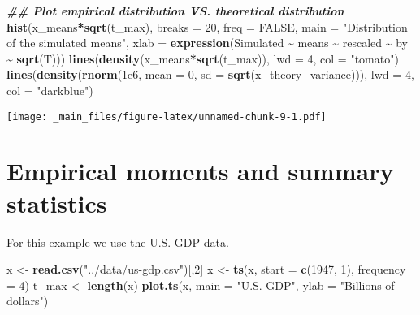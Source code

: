 \documentclass[
]{book}
\newenvironment{Shaded}{\begin{snugshade}}{\end{snugshade}}
\newcommand{\AttributeTok}[1]{\textcolor[rgb]{0.13,0.29,0.53}{#1}}
\newcommand{\ConstantTok}[1]{\textcolor[rgb]{0.56,0.35,0.01}{#1}}
\newcommand{\DecValTok}[1]{\textcolor[rgb]{0.00,0.00,0.81}{#1}}
\newcommand{\DocumentationTok}[1]{\textcolor[rgb]{0.56,0.35,0.01}{\textbf{\textit{#1}}}}
\newcommand{\FloatTok}[1]{\textcolor[rgb]{0.00,0.00,0.81}{#1}}
\newcommand{\FunctionTok}[1]{\textcolor[rgb]{0.13,0.29,0.53}{\textbf{#1}}}
\newcommand{\NormalTok}[1]{#1}
\newcommand{\OtherTok}[1]{\textcolor[rgb]{0.56,0.35,0.01}{#1}}
\newcommand{\SpecialCharTok}[1]{\textcolor[rgb]{0.81,0.36,0.00}{\textbf{#1}}}
\newcommand{\StringTok}[1]{\textcolor[rgb]{0.31,0.60,0.02}{#1}}
\begin{document}
\begin{Shaded}
\begin{Highlighting}[]
\DocumentationTok{\#\# Plot empirical distribution VS. theoretical distribution}
\FunctionTok{hist}\NormalTok{(x\_means}\SpecialCharTok{*}\FunctionTok{sqrt}\NormalTok{(t\_max), }\AttributeTok{breaks =} \DecValTok{20}\NormalTok{, }\AttributeTok{freq =} \ConstantTok{FALSE}\NormalTok{, }
     \AttributeTok{main =} \StringTok{"Distribution of the simulated means"}\NormalTok{, }
     \AttributeTok{xlab =} \FunctionTok{expression}\NormalTok{(Simulated }\SpecialCharTok{\textasciitilde{}}\NormalTok{ means }\SpecialCharTok{\textasciitilde{}}\NormalTok{ rescaled }\SpecialCharTok{\textasciitilde{}}\NormalTok{ by }\SpecialCharTok{\textasciitilde{}} \FunctionTok{sqrt}\NormalTok{(T)))}
\FunctionTok{lines}\NormalTok{(}\FunctionTok{density}\NormalTok{(x\_means}\SpecialCharTok{*}\FunctionTok{sqrt}\NormalTok{(t\_max)), }\AttributeTok{lwd =} \DecValTok{4}\NormalTok{, }\AttributeTok{col =} \StringTok{"tomato"}\NormalTok{)}
\FunctionTok{lines}\NormalTok{(}\FunctionTok{density}\NormalTok{(}\FunctionTok{rnorm}\NormalTok{(}\FloatTok{1e6}\NormalTok{, }\AttributeTok{mean =} \DecValTok{0}\NormalTok{, }\AttributeTok{sd =} \FunctionTok{sqrt}\NormalTok{(x\_theory\_variance))), }\AttributeTok{lwd =} \DecValTok{4}\NormalTok{, }\AttributeTok{col =} \StringTok{"darkblue"}\NormalTok{)}
\end{Highlighting}
\end{Shaded}

\texttt{[image: \_main\_files/figure-latex/unnamed-chunk-9-1.pdf]}

\hypertarget{empirical-moments-and-summary-statistics}{%
\section{Empirical moments and summary statistics}\label{empirical-moments-and-summary-statistics}}

For this example we use the \href{https://fred.stlouisfed.org/series/GDP}{U.S. GDP data}.

\begin{Shaded}
\begin{Highlighting}[]
\NormalTok{x }\OtherTok{\textless{}{-}} \FunctionTok{read.csv}\NormalTok{(}\StringTok{"../data/us{-}gdp.csv"}\NormalTok{)[,}\DecValTok{2}\NormalTok{]}
\NormalTok{x }\OtherTok{\textless{}{-}} \FunctionTok{ts}\NormalTok{(x, }\AttributeTok{start =} \FunctionTok{c}\NormalTok{(}\DecValTok{1947}\NormalTok{, }\DecValTok{1}\NormalTok{), }\AttributeTok{frequency =} \DecValTok{4}\NormalTok{)}
\NormalTok{t\_max }\OtherTok{\textless{}{-}} \FunctionTok{length}\NormalTok{(x)}
\FunctionTok{plot.ts}\NormalTok{(x, }\AttributeTok{main =} \StringTok{"U.S. GDP"}\NormalTok{, }\AttributeTok{ylab =} \StringTok{"Billions of dollars"}\NormalTok{)}
\end{Highlighting}
\end{Shaded}
\end{document}
